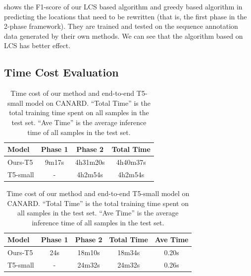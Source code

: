  shows the F1-score of our LCS based algorithm and greedy based algorithm in predicting the locations that need to be rewritten (that is, the first phase in the 2-phase framework). They are trained and tested on the sequence annotation data generated by their own methods. We can see that the algorithm based on LCS has better effect.


\subsection{Time Cost Evaluation}

\begin{table}[h]
	\scriptsize
	\centering
    \begin{subtable}[h]{\linewidth}
		\scriptsize
        \centering
\begin{tabular}{lccc}
\toprule
\textbf{Model}&   \textbf{Phase 1} &  \textbf{Phase 2}   & \textbf{Total Time}\\  \midrule
Ours-T5  &  9m17s  & 4h31m20s   & 4h40m37s \\ 
T5-small &  - & 4h2m54s   & 4h2m54s \\
\bottomrule
\end{tabular}
       \caption{Training time.}
       \label{tab:time-analysis-1}
    \end{subtable}
    \hfill
    \begin{subtable}[h]{\linewidth}
		\scriptsize
        \centering
\begin{tabular}{lcccc}
\toprule
\textbf{Model}&    \textbf{Phase 1} & \textbf{Phase 2} & \textbf{Total Time} & \textbf{Ave Time}\\  \midrule
Ours-T5 & 24s & 18m10s    & 18m34s & 0.20s \\ 
T5-small & - & 24m32s    & 24m32s & 0.26s \\
\bottomrule
\end{tabular}
        \caption{Inference Time.}
        \label{tab:time-analysis-2}
     \end{subtable}
     \caption{Time cost of our method and end-to-end T5-small model on CANARD. ``Total Time'' is the total training time spent on all samples in the test set. ``Ave Time'' is the average inference time of all samples in the test set.}
     \label{tab:time-analysis}
\end{table}

